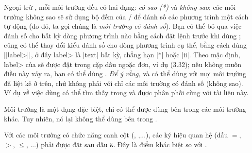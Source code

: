 \documentclass[11pt,leqno,titlepage,openany]{amsldoc}[1999/12/13]
\begin{document}
Ngoại trừ , mỗi môi trường đều có hai dạng:
\emph{có sao (*)} và \emph{không sao};
các môi trường không sao sẽ sử dụng bộ đếm  của \latex/
để đánh số các phương trình một cách tự động (do đó, ta gọi
chúng là \emph{môi trường có đánh số}).
Bạn có thể bỏ qua việc đánh số cho bất kỳ dòng phương trình nào
bằng cách đặt lệnh  trước khi dùng \cn{\\};
cũng có thể thay đổi kiểu đánh số cho dòng phương trình cụ thể, bằng
cách dùng |{|\<label>|}|, ở đây \<label> là |text| bất kỳ,
chẳng hạn |$*$| hoặc |ii|. Theo mặc định, \<label> của  sẽ được
đặt trong cặp dấu ngoặc đơn, ví dụ (3.32);
nếu không muốn điều này xảy ra, bạn có thể dùng .
\emph{Để ý rằng,}
 và  có thể dùng với mọi môi trường đã liệt kê ở trên,
chứ không phải với chỉ các môi trường có đánh số (không sao).
Ví dụ về việc dùng  có thể tìm thấy trong 
và  được phân phối cùng với tài liệu này.

\medskip
Môi trường  là một dạng đặc biệt, chỉ có thể được dùng
bên trong các môi trường khác. Tuy nhiên, nó lại không thể dùng bên
trong .

\medskip
Với các môi trường có chức năng canh cột (, ,...),
các ký hiệu quan hệ (dấu $=$, $>$, $\le$, ...) phải được đặt sau dấu \verb'&'.
Đây là điểm khác biệt so với .
\end{document}
